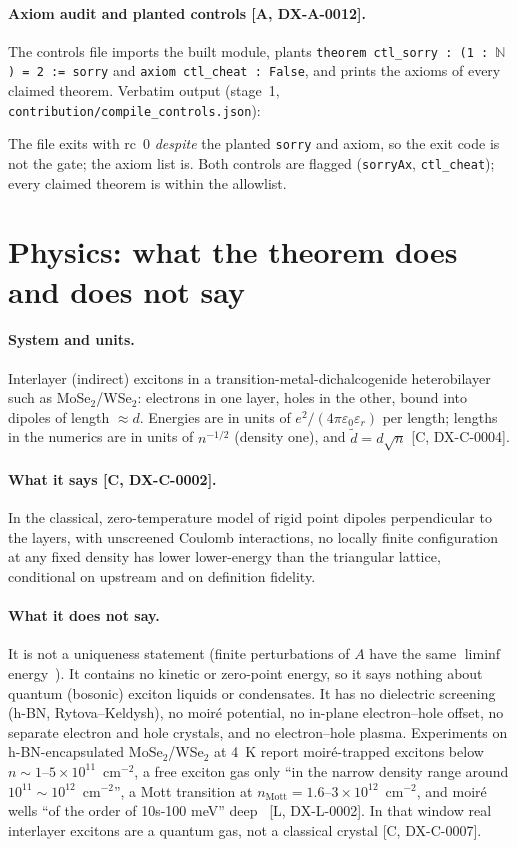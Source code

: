 \documentclass[11pt]{article}
\theoremstyle{remark}
\newcommand{\tier}[1]{\textsf{[#1]}}
\newcommand{\lean}[1]{\texttt{#1}}
\newcommand{\dt}{\tilde d}
\begin{document}
\paragraph{Axiom audit and planted controls \tier{A, DX-A-0012}.} The controls file imports the built module, plants
\texttt{theorem ctl\_sorry : (1 : $\mathbb N$) = 2 := sorry} and \texttt{axiom ctl\_cheat : False}, and prints the axioms of
every claimed theorem. Verbatim output (stage~1, \texttt{contribution/compile\_controls.json}):

The file exits with rc~0 \emph{despite} the planted \lean{sorry} and axiom, so the exit code is not the gate; the axiom
list is. Both controls are flagged (\lean{sorryAx}, \lean{ctl\_cheat}); every claimed theorem is within the allowlist.

\section{Physics: what the theorem does and does not say}\label{sec:phys}
\paragraph{System and units.} Interlayer (indirect) excitons in a transition-metal-dichalcogenide heterobilayer such as
MoSe$_2$/WSe$_2$: electrons in one layer, holes in the other, bound into dipoles of length $\approx d$. Energies are in
units of $e^2/(4\pi\varepsilon_0\varepsilon_r)$ per length; lengths in the numerics are in units of $n^{-1/2}$ (density
one), and $\dt=d\sqrt n$ \tier{C, DX-C-0004}.

\paragraph{What it says \tier{C, DX-C-0002}.} In the classical, zero-temperature model of rigid point dipoles
perpendicular to the layers, with unscreened Coulomb interactions, no locally finite configuration at any fixed density
has lower lower-energy than the triangular lattice, conditional on upstream and on definition fidelity.

\paragraph{What it does not say.} It is not a uniqueness statement (finite perturbations of $A$ have the same
$\liminf$ energy~\cite{ps}). It contains no kinetic or zero-point energy, so it says nothing about quantum (bosonic)
exciton liquids or condensates. It has no dielectric screening (h-BN, Rytova--Keldysh), no moir\'e potential, no
in-plane electron--hole offset, no separate electron and hole crystals, and no electron--hole plasma. Experiments on
h-BN-encapsulated MoSe$_2$/WSe$_2$ at 4~K report moir\'e-trapped excitons below $n\sim1$--$5\times10^{11}$~cm$^{-2}$, a
free exciton gas only ``in the narrow density range around $10^{11}\sim10^{12}$~cm$^{-2}$'', a Mott transition at
$n_\mathrm{Mott}=1.6$--$3\times10^{12}$~cm$^{-2}$, and moir\'e wells ``of the order of 10s-100 meV'' deep~\cite{wang}
\tier{L, DX-L-0002}. In that window real interlayer excitons are a quantum gas, not a classical crystal
\tier{C, DX-C-0007}.
\end{document}
